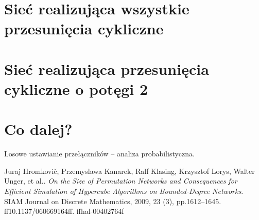 \documentclass[a4paper]{article}
\theoremstyle{definition}
\begin{document}

\section{Sieć realizująca wszystkie przesunięcia cykliczne}


\section{Sieć realizująca przesunięcia cykliczne o potęgi 2}


\section{Co dalej?}

Losowe ustawianie przełączników -- analiza probabilistyczna. 


\begin{thebibliography}{9}
Juraj Hromkovič, Przemyslawa Kanarek, Ralf Klasing, Krzysztof Lorys, Walter Unger, et al.. \emph{On the Size of Permutation Networks and Consequences for Efficient Simulation of Hypercube Algorithms on Bounded-Degree Networks}. SIAM Journal on Discrete Mathematics, 2009, 23 (3), pp.1612–1645. ff10.1137/060669164ff. ffhal-00402764f
\end{thebibliography}
\end{document}
